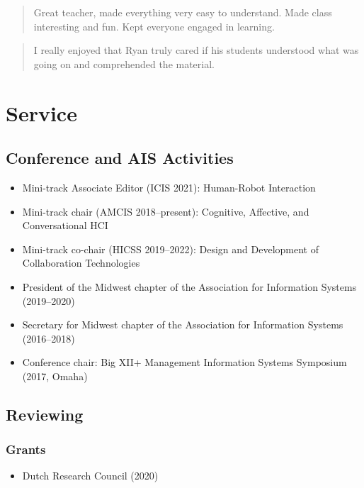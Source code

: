 \documentclass[10pt, letter]{article}
\begin{document}
\begin{quote}
	Great teacher, made everything very easy to understand. Made class interesting and
	fun. Kept everyone engaged in learning.
\end{quote}

\begin{quote}
	I really enjoyed that Ryan truly cared if his students understood what was going on and
	comprehended the material.
\end{quote}

\section*{Service}

\subsection*{Conference and AIS Activities}

\begin{itemize}
	\itemsep0em
	\item Mini-track Associate Editor (ICIS 2021): Human-Robot Interaction
	\item Mini-track chair (AMCIS 2018--present): Cognitive, Affective, and Conversational HCI
	\item Mini-track co-chair (HICSS 2019--2022): Design and Development of Collaboration Technologies
	\item President of the Midwest chapter of the Association for Information Systems (2019--2020)
	\item Secretary for Midwest chapter of the Association for Information Systems (2016--2018)
	\item Conference chair: Big XII+ Management Information Systems Symposium (2017, Omaha)
\end{itemize}

\subsection*{Reviewing}

\subsubsection*{Grants}
\begin{itemize}
	\itemsep0em
	\item Dutch Research Council (2020)
\end{itemize}
\end{document}
